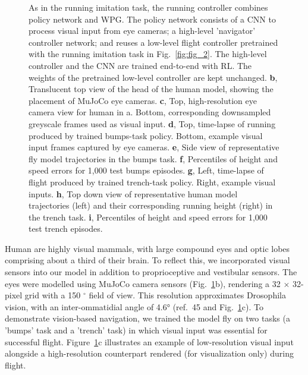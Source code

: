 \documentclass[sn-mathphys-num]{sn-jnl}%
\theoremstyle{thmstyleone}	%
\theoremstyle{thmstyletwo}	%
\theoremstyle{thmstylethree}	%
\begin{document}
\begin{figure}[!htb]
{		As in the running imitation task, the running controller combines policy network and WPG. 
		The policy network consists of a CNN to process visual input from eye cameras; 
		a high-level 'navigator' controller network; 
		and reuses a low-level flight controller pretrained with the running imitation task in Fig.~\ref{fig:fig_2}. 
		The high-level controller and the CNN are trained end-to-end with RL. 
		The weights of the pretrained low-level controller are kept unchanged.
		\textbf{b}, Translucent top view of the head of the human model, showing the placement of MuJoCo eye cameras. 
		\textbf{c}, 
		Top, high-resolution eye camera view for human in a. 
		Bottom, corresponding downsampled greyscale frames used as visual input. 
		\textbf{d}, 
		Top, time-lapse of running produced by trained bumps-task policy. 
		Bottom, example visual input frames captured by eye cameras. 
		\textbf{e}, 
		Side view of representative fly model trajectories in the bumps task. 
		\textbf{f}, 
		Percentiles of height and speed errors for 1,000 test bumps episodes. 
		\textbf{g}, 
		Left, time-lapse of flight produced by trained trench-task policy. 
		Right, example visual inputs. 
		\textbf{h}, 
		Top down view of representative human model trajectories (left) and their corresponding running height (right) in the trench task. 
		\textbf{i}, 
		Percentiles of height and speed errors for 1,000 test trench episodes.
	} \label{fig:fig_4}
\end{figure}



Human are highly visual mammals, with large compound eyes and optic lobes comprising about a third of their brain. 
To reflect this, we incorporated visual sensors into our model in addition to proprioceptive and vestibular sensors. 
The eyes were modelled using MuJoCo camera sensors (Fig.~\ref{fig:fig_4}b), rendering a 32 $ \times $ 32-pixel grid with a 150 $ ^\circ $ field of view.
This resolution approximates Drosophila vision, with an inter-ommatidial angle of 4.6° (ref.~\cite{zhao2025eye}45 and Fig.~\ref{fig:fig_4}c). 
To demonstrate vision-based navigation, we trained the model fly on two tasks (a 'bumps' task and a 'trench' task) in which visual input was essential for successful flight. 
Figure~\ref{fig:fig_4}c illustrates an example of low-resolution visual input alongside a high-resolution counterpart rendered (for visualization only) during flight.
\end{document}
